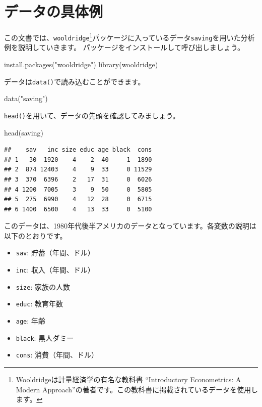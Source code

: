 \documentclass[
]{book}
\newenvironment{Shaded}{\begin{snugshade}}{\end{snugshade}}
\newcommand{\FunctionTok}[1]{\textcolor[rgb]{0.00,0.00,0.00}{#1}}
\newcommand{\NormalTok}[1]{#1}
\newcommand{\StringTok}[1]{\textcolor[rgb]{0.31,0.60,0.02}{#1}}
\providecommand{\tightlist}{%
  \setlength{\itemsep}{0pt}\setlength{\parskip}{0pt}}
\begin{document}
\hypertarget{ux30c7ux30fcux30bfux306eux5177ux4f53ux4f8b}{%
\section{データの具体例}\label{ux30c7ux30fcux30bfux306eux5177ux4f53ux4f8b}}

この文書では、\texttt{wooldridge}\footnote{Wooldridgeは計量経済学の有名な教科書 ``Introductory Econometrics: A Modern Approach''の著者です。この教科書に掲載されているデータを使用します。}パッケージに入っているデータ\texttt{saving}を用いた分析例を説明していきます。
パッケージをインストールして呼び出しましょう。

\begin{Shaded}
\begin{Highlighting}[]
\FunctionTok{install.packages}\NormalTok{(}\StringTok{"wooldridge"}\NormalTok{)}
\FunctionTok{library}\NormalTok{(wooldridge)}
\end{Highlighting}
\end{Shaded}

データは\texttt{data()}で読み込むことができます。

\begin{Shaded}
\begin{Highlighting}[]
\FunctionTok{data}\NormalTok{(}\StringTok{"saving"}\NormalTok{)}
\end{Highlighting}
\end{Shaded}

\texttt{head()}を用いて、データの先頭を確認してみましょう。

\begin{Shaded}
\begin{Highlighting}[]
\FunctionTok{head}\NormalTok{(saving)}
\end{Highlighting}
\end{Shaded}

\begin{verbatim}
##    sav   inc size educ age black  cons
## 1   30  1920    4    2  40     1  1890
## 2  874 12403    4    9  33     0 11529
## 3  370  6396    2   17  31     0  6026
## 4 1200  7005    3    9  50     0  5805
## 5  275  6990    4   12  28     0  6715
## 6 1400  6500    4   13  33     0  5100
\end{verbatim}

このデータは、1980年代後半アメリカのデータとなっています。各変数の説明は以下のとおりです。

\begin{itemize}
\tightlist
\item
  \texttt{sav}: 貯蓄（年間、ドル）
\item
  \texttt{inc}: 収入（年間、ドル）
\item
  \texttt{size}: 家族の人数
\item
  \texttt{educ}: 教育年数
\item
  \texttt{age}: 年齢
\item
  \texttt{black}: 黒人ダミー
\item
  \texttt{cons}: 消費（年間、ドル）
\end{itemize}
\end{document}
